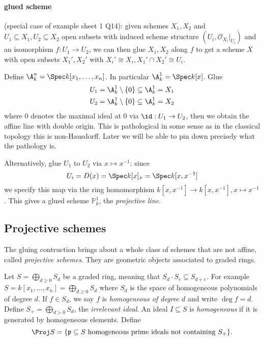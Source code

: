 \documentclass[a4paper]{article}
\renewcommand*{\P}{\mathbb{P}}
\newcommand{\sh}[1]{\mathcal{#1}} %
\begin{document}
\paragraph{glued scheme}

(special case of example sheet 1 Q14): given schemes \(X_1, X_2\) and \(U_1 \subseteq X_1, U_2 \subseteq X_2\) open subsets with induced scheme structure \((U_i, \sh O_{X_i}|_{U_i})\) and an isomorphism \(f: U_1 \to U_2\), we can then glue \(X_1, X_2\) along \(f\) to get a scheme \(X\) with open subsets \(X_1', X_2'\) with \(X_i' \cong X_i, X_1' \cap X_2' \cong U_i\).

\begin{eg}
  Define \(\A_k^n = \Spec k[x_1, \dots, x_n]\). In particular \(\A_k^1 = \Spec k[x]\). Glue
  \begin{align*}
    U_1 &= \A_k^1 \setminus \{0\} \subseteq \A_k^1 = X_1 \\
    U_2 &= \A_k^1 \setminus \{0\} \subseteq \A_k^1 = X_2
  \end{align*}
  where \(0\) denotes the maximal ideal at \(0\) via \(\id: U_1 \to U_2\), then we obtain the affine line with double origin. This is pathological in some sense as in the classical topology this is non-Hausdorff. Later we will be able to pin down precisely what the pathology is.

  Alternatively, glue \(U_1\) to \(U_2\) via \(x \mapsto x^{-1}\): since
  \[
    U_i = D(x) = \Spec k[x]_x = \Spec k[x, x^{-1}]
  \]
  we specify this map via the ring homomorphism \(k[x, x^{-1}] \to k[x, x^{-1}], x \mapsto x^{-1}\). This gives a glued scheme \(\P_k^1\), the \emph{projective line}.
\end{eg}

\subsection{Projective schemes}

The gluing contruction brings about a whole class of schemes that are not affine, called \emph{projective schemes}. They are geometric objects associated to graded rings.

Let \(S = \bigoplus_{d \geq 0} S_d\) be a graded ring, meaning that \(S_d \cdot S_e \subseteq S_{d + e}\). For example \(S = k[x_1, \dots, x_n] = \bigoplus_{d \geq 0} S_d\) where \(S_d\) is the space of homogeneous polynomials of degree \(d\). If \(f \in S_d\), we say \(f\) is \emph{homogeneous of degree \(d\)} and write \(\deg f = d\). Define \(S_+ = \bigoplus_{d > 0} S_d\), the \emph{irrelevant ideal}. An ideal \(I \subseteq S\) is \emph{homogeneous} if it is generated by homogeneous elements. Define
\[
  \Proj S = \{\mathfrak p \subseteq S \text{ homogeneous prime ideals not containing } S_+\}.
\]
\end{document}

